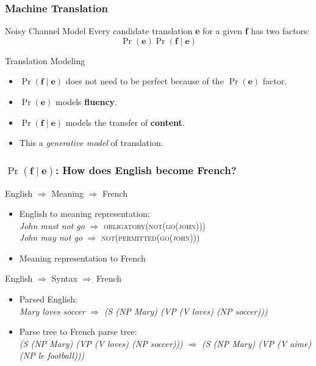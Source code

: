 \begin{frame}
\frametitle{Machine Translation}
\begin{block}{Noisy Channel Model}
Every candidate translation \textbf{e} for a given \textbf{f} has two factors:
\[ \Pr( \textbf{e} ) \Pr( \textbf{f} \mid \textbf{e} ) \]
\end{block}\pause
\begin{block}{Translation Modeling}
\begin{itemize}[<+->]
\item $\Pr( \textbf{f} \mid \textbf{e} )$ does not need to be perfect because of the $\Pr( \textbf{e} )$ factor.
\item $\Pr( \textbf{e} )$ models \textbf{fluency}.
\item $\Pr( \textbf{f} \mid \textbf{e} )$ models the transfer of \textbf{content}.
\item This a \textit{generative model} of translation.
\end{itemize}
\end{block}
\end{frame}

\begin{frame}
\frametitle{$\Pr( \textbf{f} \mid \textbf{e} )$: How does English become French?}
\begin{alertblock}{English $\Rightarrow$ Meaning $\Rightarrow$ French}
\begin{itemize}
\item English to meaning representation: \\
\textit{John must not go} $\Rightarrow$ \textsc{obligatory(not(go(john)))} \\
\textit{John may not go} $\Rightarrow$ \textsc{not(permitted(go(john)))}
\item Meaning representation to French
\end{itemize}
\end{alertblock}\pause
\begin{alertblock}{English $\Rightarrow$ Syntax $\Rightarrow$ French}
\begin{itemize}
\item Parsed English: \\
\textit{Mary loves soccer} $\Rightarrow$ \textit{(S (NP Mary) (VP (V loves) (NP soccer)))}
\item Parse tree to French parse tree: \\
\textit{(S (NP Mary) (VP (V loves) (NP soccer)))} $\Rightarrow$ \textit{(S (NP Mary) (VP (V aime) (NP le football)))}
\end{itemize}
\end{alertblock}
\end{frame}

